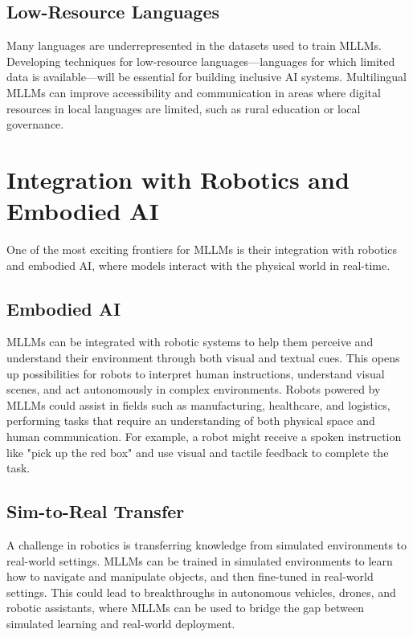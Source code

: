 \subsection{Low-Resource Languages}

Many languages are underrepresented in the datasets used to train MLLMs. Developing techniques for low-resource languages—languages for which limited data is available—will be essential for building inclusive AI systems. Multilingual MLLMs can improve accessibility and communication in areas where digital resources in local languages are limited, such as rural education or local governance.

\section{Integration with Robotics and Embodied AI}

One of the most exciting frontiers for MLLMs is their integration with robotics and embodied AI, where models interact with the physical world in real-time.

\subsection{Embodied AI}

MLLMs can be integrated with robotic systems to help them perceive and understand their environment through both visual and textual cues. This opens up possibilities for robots to interpret human instructions, understand visual scenes, and act autonomously in complex environments. Robots powered by MLLMs could assist in fields such as manufacturing, healthcare, and logistics, performing tasks that require an understanding of both physical space and human communication. For example, a robot might receive a spoken instruction like "pick up the red box" and use visual and tactile feedback to complete the task.

\subsection{Sim-to-Real Transfer}

A challenge in robotics is transferring knowledge from simulated environments to real-world settings. MLLMs can be trained in simulated environments to learn how to navigate and manipulate objects, and then fine-tuned in real-world settings. This could lead to breakthroughs in autonomous vehicles, drones, and robotic assistants, where MLLMs can be used to bridge the gap between simulated learning and real-world deployment.

